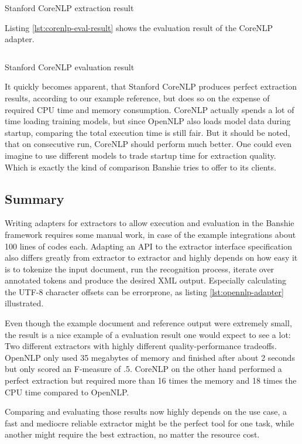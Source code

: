 \begin{listing}[H]
\inputminted{xml}{corenlp.xml}
\caption{Stanford CoreNLP extraction result}
\label{lst:corenlp-result}
\end{listing}

\newpage
Listing \ref{lst:corenlp-eval-result} shows the evaluation result of the CoreNLP adapter.


\begin{listing}[H]
\inputminted{java}{corenlp.txt}
\caption{Stanford CoreNLP evaluation result}
\label{lst:corenlp-eval-result}
\end{listing}

It quickly becomes apparent, that Stanford CoreNLP produces perfect extraction results, according to our example reference, but does so on the expense of required CPU time and memory consumption. CoreNLP actually spends a lot of time loading training models, but since OpenNLP also loads model data during startup, comparing the total execution time is still fair. But it should be noted, that on consecutive run, CoreNLP should perform much better. One could even imagine to use different models to trade startup time for extraction quality. Which is exactly the kind of comparison Banshie tries to offer to its clients.

\newpage
\subsection{Summary}
Writing adapters for extractors to allow execution and evaluation in the Banshie framework requires some manual work, in case of the example integrations about 100 lines of codes each. Adapting an \gls{API} to the extractor interface specification also differs greatly from extractor to extractor and highly depends on how easy it is to tokenize the input document, run the recognition process, iterate over annotated tokens and produce the desired \gls{XML} output. Especially calculating the UTF-8 character offsets can be errorprone, as listing \ref{lst:opennlp-adapter} illustrated.

Even though the example document and reference output were extremely small, the result is a nice example of a evaluation result one would expect to see a lot: Two different extractors with highly different quality-performance tradeoffs. OpenNLP only used 35 megabytes of memory and finished after about 2 seconds but only scored an F-measure of .5. CoreNLP on the other hand performed a perfect extraction but required more than 16 times the memory and 18 times the CPU time compared to OpenNLP.

Comparing and evaluating those results now highly depends on the use case, a fast and mediocre reliable extractor might be the perfect tool for one task, while another might require the best extraction, no matter the resource cost.